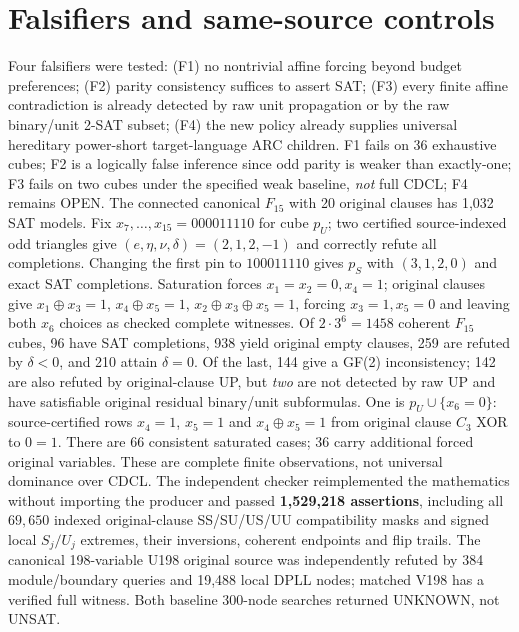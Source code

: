 \documentclass[11pt]{article}
\begin{document}
\section*{Falsifiers and same-source controls}
Four falsifiers were tested: (F1) no nontrivial affine forcing beyond budget preferences; (F2) parity consistency suffices to assert SAT; (F3) every finite affine contradiction is already detected by raw unit propagation or by the raw binary/unit 2-SAT subset; (F4) the new policy already supplies universal hereditary power-short target-language ARC children. F1 fails on 36 exhaustive cubes; F2 is a logically false inference since odd parity is weaker than exactly-one; F3 fails on two cubes under the specified weak baseline, \emph{not} full CDCL; F4 remains OPEN.
The connected canonical $F_{15}$ with 20 original clauses has 1,032 SAT models. Fix $x_7,\dots,x_{15}=000011110$ for cube $p_U$; two certified source-indexed odd triangles give $(e,\eta,\nu,\delta)=(2,1,2,-1)$ and correctly refute all completions. Changing the first pin to $100011110$ gives $p_S$ with $(3,1,2,0)$ and exact SAT completions. Saturation forces $x_1=x_2=0,x_4=1$; original clauses give $x_1\oplus x_3=1$, $x_4\oplus x_5=1$, $x_2\oplus x_3\oplus x_5=1$, forcing $x_3=1,x_5=0$ and leaving both $x_6$ choices as checked complete witnesses.
Of $2\cdot3^6=1458$ coherent $F_{15}$ cubes, 96 have SAT completions, 938 yield original empty clauses, 259 are refuted by $\delta<0$, and 210 attain $\delta=0$. Of the last, 144 give a GF(2) inconsistency; 142 are also refuted by original-clause UP, but \emph{two} are not detected by raw UP and have satisfiable original residual binary/unit subformulas. One is $p_U\cup\{x_6=0\}$: source-certified rows $x_4=1$, $x_5=1$ and $x_4\oplus x_5=1$ from original clause $C_3$ XOR to $0=1$. There are 66 consistent saturated cases; 36 carry additional forced original variables. These are complete finite observations, not universal dominance over CDCL.
The independent checker reimplemented the mathematics without importing the producer and passed \textbf{1,529,218 assertions}, including all $69,650$ indexed original-clause SS/SU/US/UU compatibility masks and signed local $S_j/U_j$ extremes, their inversions, coherent endpoints and flip trails. The canonical 198-variable U198 original source was independently refuted by 384 module/boundary queries and 19,488 local DPLL nodes; matched V198 has a verified full witness. Both baseline 300-node searches returned UNKNOWN, not UNSAT.
\end{document}
